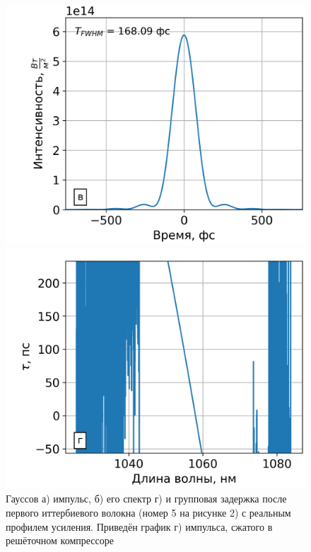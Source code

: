 \documentclass[12pt]{article}
\begin{document}
\begin{figure}[h!]
  \vspace{}

  \begin{minipage}[b]{0.5\textwidth}
    \includegraphics[width=\linewidth]{Images/Gauss Pulse/После компрессора/8 элемент gamma=49.49162 l_g=0.36725 сжатие}
  \end{minipage}%
  \begin{minipage}[b]{0.5\textwidth}
    \includegraphics[width=\linewidth]{Images/Gauss Pulse/Импульс и спектр/!8. Yb3+ 6_125, 0.9m_time_delay}
  \end{minipage}

  \caption{Гауссов а) импульс, б) его спектр г) и групповая задержка после первого иттербиевого волокна (номер 5 на
  рисунке 2) с реальным профилем усиления. Приведён график г) импульса, сжатого в решёточном компрессоре}
  \label{fig:both}
\end{figure}
\end{document}
